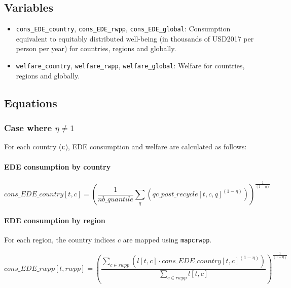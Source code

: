 \documentclass[
]{article}
\providecommand{\tightlist}{%
  \setlength{\itemsep}{0pt}\setlength{\parskip}{0pt}}
\begin{document}
\subsection{Variables}\label{variables-8}

\begin{itemize}
\tightlist
\item
  \texttt{cons\_EDE\_country}, \texttt{cons\_EDE\_rwpp},
  \texttt{cons\_EDE\_global}: Consumption equivalent to equitably
  distributed well-being (in thousands of USD2017 per person per year)
  for countries, regions and globally.
\item
  \texttt{welfare\_country}, \texttt{welfare\_rwpp},
  \texttt{welfare\_global}: Welfare for countries, regions and globally.
\end{itemize}

\subsection{Equations}\label{equations-5}

\subsubsection{\texorpdfstring{Case where
$\eta \neq 1$}{Case where \textbackslash eta \textbackslash neq 1}}\label{case-where-eta-neq-1}

For each country (\texttt{c}), EDE consumption and welfare are
calculated as follows:

\paragraph{EDE consumption by
country}\label{ede-consumption-by-country}

\begin{equation}
  cons\_EDE\_country[t,c] = \left( \frac{1}{nb\_quantile} \sum_q (qc\_post\_recycle[t,c,q]^{(1-\eta)} ) \right)^{\frac{1}{(1-\eta)}}
\end{equation}

\paragraph{EDE consumption by
region}\label{ede-consumption-by-region}

For each region, the country indices \(c\) are mapped using
\texttt{mapcrwpp}.

\begin{equation}
  cons\_EDE\_rwpp[t,rwpp] = \left( \frac{\sum_{c \in rwpp} (l[t,c] \cdot cons\_EDE\_country[t,c]^{(1-\eta)})}{\sum_{c \in rwpp} l[t,c]} \right)^{\frac{1}{(1-\eta)}}
\end{equation}
\end{document}
